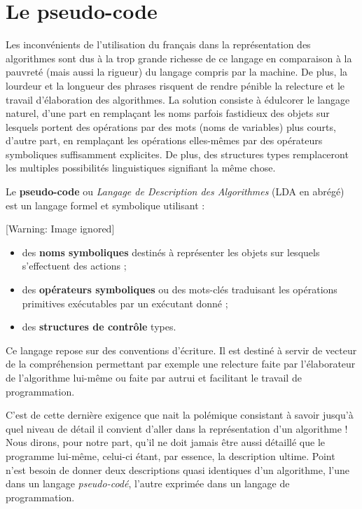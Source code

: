 {
}

\section[Le pseudo{}-code]{\bfseries Le pseudo-code}
{
Les inconvénients de l’utilisation du français dans la représentation
des algorithmes sont dus à la trop grande richesse de ce langage en
comparaison à la pauvreté (mais aussi la rigueur) du langage compris
par la machine. De plus, la lourdeur et la longueur des phrases
risquent de rendre pénible la relecture et le travail d’élaboration des
algorithmes. La solution consiste à édulcorer le langage naturel, d’une
part en remplaçant les noms parfois fastidieux des objets sur lesquels
portent des opérations par des mots (noms de variables) plus courts,
d’autre part, en remplaçant les opérations elles-mêmes par des
opérateurs symboliques suffisamment explicites. De plus, des structures
types remplaceront les multiples possibilités linguistiques signifiant
la même chose.}

{
Le \textbf{pseudo-code} ou \textit{Langage de Description des
Algorithmes} (LDA en abrégé) est un langage formel et symbolique
utilisant :}

\begin{center}
 [Warning: Image ignored] %

\end{center}
\liststyleListv
\begin{itemize}
\item {
des \textbf{noms symboliques} destinés à représenter les objets sur
lesquels s’effectuent des actions ;}
\item {
des \textbf{opérateurs symboliques} ou des mots-clés traduisant les
opérations primitives exécutables par un exécutant donné ;}
\item {
des \textbf{structures de contrôle} types.}
\end{itemize}
{
Ce langage repose sur des conventions d’écriture. Il est destiné à
servir de vecteur de la compréhension permettant par exemple une
relecture faite par l’élaborateur de l’algorithme lui-même ou faite par
autrui et facilitant le travail de programmation.}

{
C’est de cette dernière exigence que nait la polémique consistant à
savoir jusqu’à quel niveau de détail il convient d’aller dans la
représentation d’un algorithme ! Nous dirons, pour notre part, qu’il ne
doit jamais être aussi détaillé que le programme lui-même, celui-ci
étant, par essence, la description ultime. Point n’est besoin de donner
deux descriptions quasi identiques d’un algorithme, l’une dans un
langage \textit{pseudo-codé}, l’autre exprimée dans un langage de
programmation.}

